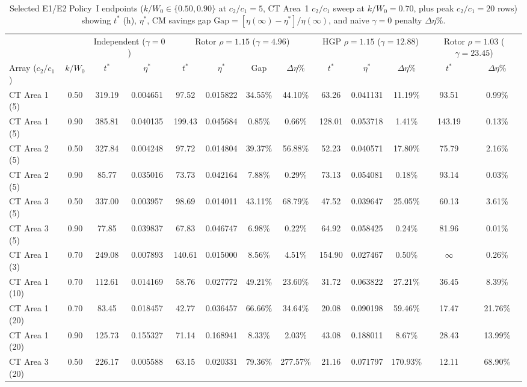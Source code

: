 \documentclass{elektr}
\begin{document}
\begin{table}[htbp]
\centering
\scriptsize
\renewcommand{\arraystretch}{0.80}
\setlength{\tabcolsep}{1.5pt}
\caption{Selected E1/E2 Policy~I endpoints ($k/W_0 \in \{0.50, 0.90\}$ at $c_2/c_1 = 5$, CT Area~1 $c_2/c_1$ sweep at $k/W_0 = 0.70$, plus peak $c_2/c_1 = 20$ rows) showing $t^*$ (h), $\eta^*$, CM savings gap $\mathrm{Gap} = [\eta(\infty)-\eta^*]/\eta(\infty)$, and naive $\gamma = 0$ penalty $\Delta\eta\%$.}
\label{tab:case_e1_e2}
\begin{tabular*}{\textwidth}{@{\extracolsep{\fill}}lc|cc|cccc|ccc|cc@{}}
\toprule
 & & \multicolumn{2}{c|}{Independent ($\gamma = 0$)} & \multicolumn{4}{c|}{Rotor $\rho=1.15$ ($\gamma=4.96$)} & \multicolumn{3}{c|}{HGP $\rho=1.15$ ($\gamma=12.88$)} & \multicolumn{2}{c}{Rotor $\rho=1.03$ ($\gamma=23.45$)} \\
Array ($c_2/c_1$) & $k/W_0$ & $t^*$ & $\eta^*$ & $t^*$ & $\eta^*$ & Gap & $\Delta\eta\%$ & $t^*$ & $\eta^*$ & $\Delta\eta\%$ & $t^*$ & $\Delta\eta\%$ \\
\midrule
CT Area 1 (5)  & 0.50 & 319.19 & 0.004651 & 97.52  & 0.015822 & 34.55\% & 44.10\% & 63.26  & 0.041131 & 11.19\% & 93.51  & 0.99\% \\
CT Area 1 (5)  & 0.90 & 385.81 & 0.040135 & 199.43 & 0.045684 & 0.85\%  & 0.66\%  & 128.01 & 0.053718 & 1.41\%  & 143.19 & 0.13\% \\
CT Area 2 (5)  & 0.50 & 327.84 & 0.004248 & 97.72  & 0.014804 & 39.37\% & 56.88\% & 52.23  & 0.040571 & 17.80\% & 75.79  & 2.16\% \\
CT Area 2 (5)  & 0.90 & 85.77  & 0.035016 & 73.73  & 0.042164 & 7.88\%  & 0.29\%  & 73.13  & 0.054081 & 0.18\%  & 93.14  & 0.03\% \\
CT Area 3 (5)  & 0.50 & 337.00 & 0.003957 & 98.69  & 0.014011 & 43.11\% & 68.79\% & 47.52  & 0.039647 & 25.05\% & 60.13  & 3.61\% \\
CT Area 3 (5)  & 0.90 & 77.85  & 0.039837 & 67.83  & 0.046747 & 6.98\%  & 0.22\%  & 64.92  & 0.058425 & 0.24\%  & 81.96  & 0.01\% \\
\midrule
CT Area 1 (3)  & 0.70 & 249.08 & 0.007893 & 140.61 & 0.015000 & 8.56\%  & 4.51\%  & 154.90 & 0.027467 & 0.50\%  & $\infty$ & 0.26\% \\
CT Area 1 (10) & 0.70 & 112.61 & 0.014169 & 58.76  & 0.027772 & 49.21\% & 23.60\% & 31.72  & 0.063822 & 27.21\% & 36.45  & 8.39\% \\
CT Area 1 (20) & 0.70 & 83.45  & 0.018457 & 42.77  & 0.036457 & 66.66\% & 34.64\% & 20.08  & 0.090198 & 59.46\% & 17.47  & 21.76\% \\
CT Area 1 (20) & 0.90 & 125.73 & 0.155327 & 71.14  & 0.168941 & 8.33\%  & 2.03\%  & 43.08  & 0.188011 & 8.67\%  & 28.43  & 13.99\% \\
CT Area 3 (20) & 0.50 & 226.17 & 0.005588 & 63.15  & 0.020331 & 79.36\% & 277.57\% & 21.16 & 0.071797 & 170.93\% & 12.11 & 68.90\% \\
\bottomrule
\end{tabular*}
\end{table}
\end{document}
